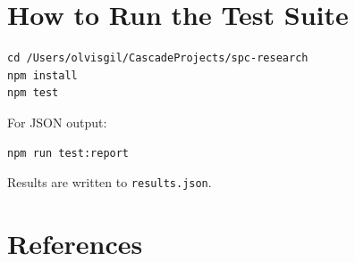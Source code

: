 \documentclass[12pt,a4paper]{article}
\begin{document}
\section{How to Run the Test Suite}

\begin{verbatim}
cd /Users/olvisgil/CascadeProjects/spc-research
npm install
npm test
\end{verbatim}

For JSON output:
\begin{verbatim}
npm run test:report
\end{verbatim}

Results are written to \texttt{results.json}.

\section*{References}
\end{document}
